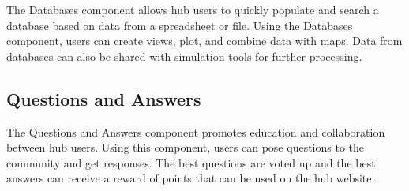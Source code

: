 The Databases component allows hub users to quickly populate and search a
database based on data from a spreadsheet or file. Using the Databases
component, users can create views, plot, and combine data with maps. Data from
databases can also be shared with simulation tools for further processing.

%
%
%


\subsection{Questions and Answers}
\label{ssec:hub_components_questions_answers}

The Questions and Answers component promotes education and collaboration
between hub users. Using this component, users can pose questions to the
community and get responses. The best questions are voted up and the best
answers can receive a reward of points that can be used on the hub website.


